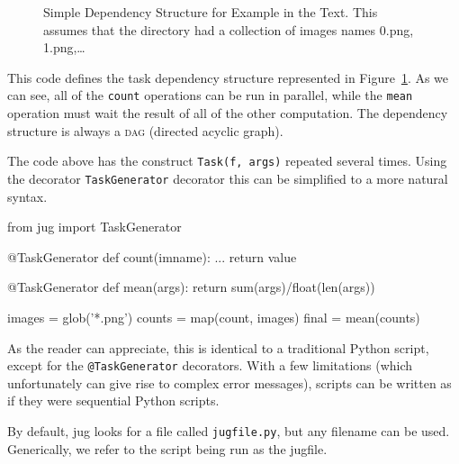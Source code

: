 \documentclass{article}
\let\code\texttt
\begin{document}
\begin{figure}
\begin{center}

\end{center}
\caption{Simple Dependency Structure for Example in the Text. This assumes that
the directory had a collection of images names 0.png, 1.png,\ldots}
\label{fig:jug-deps}
\end{figure}

This code defines the task dependency structure represented in
Figure~\ref{fig:jug-deps}. As we can see, all of the \code{count} operations
can be run in parallel, while the \code{mean} operation must wait the result of
all of the other computation. The dependency structure is always a \textsc{dag}
(directed acyclic graph).

The code above has the construct \code{Task(f, args)} repeated several times.
Using the decorator \code{TaskGenerator} decorator this can be simplified to a
more natural syntax.

\begin{python}
from jug import TaskGenerator

@TaskGenerator
def count(imname):
    ...
    return value

@TaskGenerator
def mean(args):
    return sum(args)/float(len(args))

images = glob('*.png')
counts = map(count, images)
final = mean(counts)
\end{python}

As the reader can appreciate, this is identical to a traditional Python script,
except for the \code{@TaskGenerator} decorators. With a few limitations (which
unfortunately can give rise to complex error messages), scripts can be written
as if they were sequential Python scripts.

By default, jug looks for a file called \code{jugfile.py}, but any filename can
be used. Generically, we refer to the script being run as the jugfile.
\end{document}

